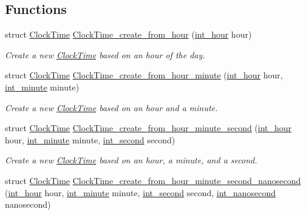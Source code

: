 \subsection*{\-Functions}
\begin{DoxyCompactItemize}
\item 
struct \hyperlink{structClockTime}{\-Clock\-Time} \hyperlink{clock-time_8h_a172dd5f4ae9a67a7d0efe2b7c3e1a7b9}{\-Clock\-Time\-\_\-create\-\_\-from\-\_\-hour} (\hyperlink{types_8h_afc81a27a9c08f0790f17b34bdf95cdb7}{int\-\_\-hour} hour)
\begin{DoxyCompactList}\small\item\em \-Create a new \hyperlink{structClockTime}{\-Clock\-Time} based on an hour of the day. \end{DoxyCompactList}\item 
struct \hyperlink{structClockTime}{\-Clock\-Time} \hyperlink{clock-time_8h_ab1d019479c07792ba3789d4611bf47bd}{\-Clock\-Time\-\_\-create\-\_\-from\-\_\-hour\-\_\-minute} (\hyperlink{types_8h_afc81a27a9c08f0790f17b34bdf95cdb7}{int\-\_\-hour} hour, \hyperlink{types_8h_ae648329a919e6d860ef5ef2aac4ffb86}{int\-\_\-minute} minute)
\begin{DoxyCompactList}\small\item\em \-Create a new \hyperlink{structClockTime}{\-Clock\-Time} based on an hour and a minute. \end{DoxyCompactList}\item 
struct \hyperlink{structClockTime}{\-Clock\-Time} \hyperlink{clock-time_8h_a1015eecfae508e22c54a4f1b52634fbf}{\-Clock\-Time\-\_\-create\-\_\-from\-\_\-hour\-\_\-minute\-\_\-second} (\hyperlink{types_8h_afc81a27a9c08f0790f17b34bdf95cdb7}{int\-\_\-hour} hour, \hyperlink{types_8h_ae648329a919e6d860ef5ef2aac4ffb86}{int\-\_\-minute} minute, \hyperlink{types_8h_acdee90940aea1c6f3e71652fb525a987}{int\-\_\-second} second)
\begin{DoxyCompactList}\small\item\em \-Create a new \hyperlink{structClockTime}{\-Clock\-Time} based on an hour, a minute, and a second. \end{DoxyCompactList}\item 
struct \hyperlink{structClockTime}{\-Clock\-Time} \hyperlink{clock-time_8h_acc3b0e5400f78e25499a815f4068739e}{\-Clock\-Time\-\_\-create\-\_\-from\-\_\-hour\-\_\-minute\-\_\-second\-\_\-nanosecond} (\hyperlink{types_8h_afc81a27a9c08f0790f17b34bdf95cdb7}{int\-\_\-hour} hour, \hyperlink{types_8h_ae648329a919e6d860ef5ef2aac4ffb86}{int\-\_\-minute} minute, \hyperlink{types_8h_acdee90940aea1c6f3e71652fb525a987}{int\-\_\-second} second, \hyperlink{types_8h_a2a3f766e7346eb6ae01022cd28128ea6}{int\-\_\-nanosecond} nanosecond)

\end{DoxyCompactItemize}
